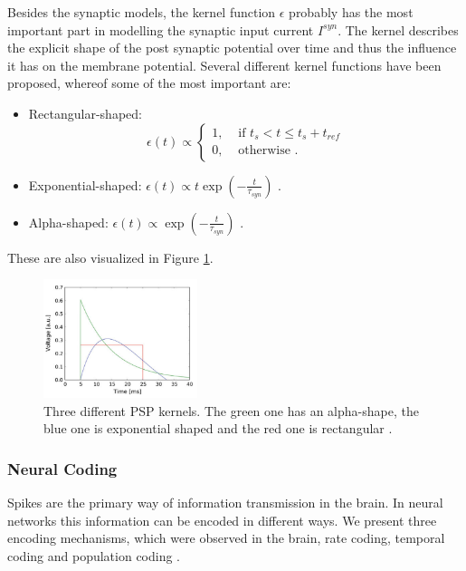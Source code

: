 Besides the synaptic models, the kernel function $\epsilon$ probably has the most important part in modelling the synaptic input current $I^{syn}$. 
The kernel describes the explicit shape of the post synaptic potential over time and thus the influence it has on the membrane potential.
Several different kernel functions have been proposed, whereof some of the most important are:
\begin{itemize}
\item Rectangular-shaped: \[\epsilon(t) \propto  \begin{cases} 1, & \text{ if } t_{s} < t \le t_{s} + t_{ref} \\ 0, & \text{ otherwise .} \end{cases} \] 
\item Exponential-shaped: $\epsilon(t) \propto t \exp(- \frac{t}{\tau_{syn}})$ .
\item Alpha-shaped: $\epsilon(t) \propto \exp(- \frac{t}{\tau_{syn}})$ .
\end{itemize}

These are also visualized in Figure \ref{fig:pspkernels}.

\begin{figure}
	\centering
    	\includegraphics[width=0.4\textwidth]{imgs/psp_kernel.png} 
    \caption[PSP kernels.]{Three different PSP kernels. The green one has an alpha-shape, the blue one is exponential shaped and the red one is rectangular \cite{Petrovici2016}. }
	\label{fig:pspkernels}
\end{figure}

\subsubsection{Neural Coding} \label{c:neuralcoding}

Spikes are the primary way of information transmission in the brain.
In neural networks this information can be encoded in different ways.
We present three encoding mechanisms, which were observed in the brain, rate coding, temporal coding and population coding \cite{Meftah2013}.

